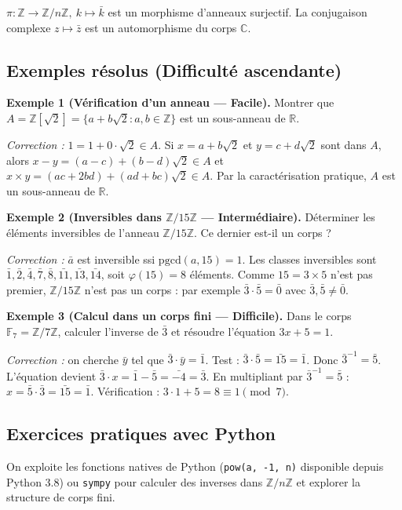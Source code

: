 \begin{exemple}
$\pi : \mathbb{Z} \to \mathbb{Z}/n\mathbb{Z},\ k \mapsto \bar{k}$ est un morphisme d'anneaux surjectif.
La conjugaison complexe $z \mapsto \bar{z}$ est un automorphisme du corps $\mathbb{C}$.
\end{exemple}

\subsection{Exemples résolus (Difficulté ascendante)}

\textbf{Exemple 1 (Vérification d'un anneau --- Facile).}
Montrer que $A = \mathbb{Z}[\sqrt{2}] = \{a + b\sqrt{2} : a, b \in \mathbb{Z}\}$ est un sous-anneau de $\mathbb{R}$.

\textit{Correction :} $1 = 1 + 0 \cdot \sqrt{2} \in A$. Si $x = a + b\sqrt{2}$ et $y = c + d\sqrt{2}$ sont dans $A$, alors $x - y = (a-c) + (b-d)\sqrt{2} \in A$ et $x \times y = (ac + 2bd) + (ad + bc)\sqrt{2} \in A$. Par la caractérisation pratique, $A$ est un sous-anneau de $\mathbb{R}$.

\medskip

\textbf{Exemple 2 (Inversibles dans $\mathbb{Z}/15\mathbb{Z}$ --- Intermédiaire).}
Déterminer les éléments inversibles de l'anneau $\mathbb{Z}/15\mathbb{Z}$. Ce dernier est-il un corps ?

\textit{Correction :} $\bar{a}$ est inversible ssi $\mathrm{pgcd}(a, 15) = 1$. Les classes inversibles sont $\bar{1}, \bar{2}, \bar{4}, \bar{7}, \bar{8}, \bar{11}, \bar{13}, \bar{14}$, soit $\varphi(15) = 8$ éléments. Comme $15 = 3 \times 5$ n'est pas premier, $\mathbb{Z}/15\mathbb{Z}$ n'est pas un corps : par exemple $\bar{3} \cdot \bar{5} = \bar{0}$ avec $\bar{3}, \bar{5} \neq \bar{0}$.

\medskip

\textbf{Exemple 3 (Calcul dans un corps fini --- Difficile).}
Dans le corps $\mathbb{F}_7 = \mathbb{Z}/7\mathbb{Z}$, calculer l'inverse de $\bar{3}$ et résoudre l'équation $3x + 5 = 1$.

\textit{Correction :} on cherche $\bar{y}$ tel que $\bar{3} \cdot \bar{y} = \bar{1}$. Test : $\bar{3} \cdot \bar{5} = \bar{15} = \bar{1}$. Donc $\bar{3}^{-1} = \bar{5}$.
L'équation devient $\bar{3} \cdot x = \bar{1} - \bar{5} = \bar{-4} = \bar{3}$. En multipliant par $\bar{3}^{-1} = \bar{5}$ : $x = \bar{5} \cdot \bar{3} = \bar{15} = \bar{1}$.
Vérification : $3 \cdot 1 + 5 = 8 \equiv 1 \pmod{7}$. \checkmark

\subsection{Exercices pratiques avec Python}
On exploite les fonctions natives de Python (\texttt{pow(a, -1, n)} disponible depuis Python 3.8) ou \texttt{sympy} pour calculer des inverses dans $\mathbb{Z}/n\mathbb{Z}$ et explorer la structure de corps fini.

